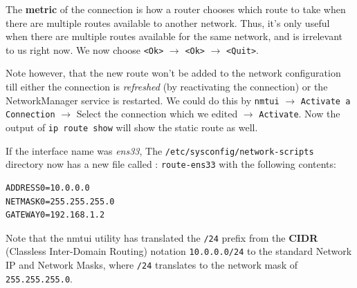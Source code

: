 The \textbf{metric} of the connection is how a router chooses which route to take when there are multiple routes available to another network. Thus, it's only useful when there are multiple routes available for the same network, and is irrelevant to us right now. We now choose \verb|<Ok>| $\rightarrow$ \verb|<Ok>| $\rightarrow$ \verb|<Quit>|. 

Note however, that the new route won't be added to the network configuration till either the connection is \textit{refreshed} (by reactivating the connection) or the NetworkManager service is restarted. We could do this by \verb|nmtui| $\rightarrow$ \verb|Activate a Connection| $\rightarrow$ Select the connection which we edited $\rightarrow$ \verb|Activate|. Now the output of \verb|ip route show| will show the static route as well. 

If the interface name was \textit{ens33}, The \verb|/etc/sysconfig/network-scripts| directory now has a new file called : \verb|route-ens33| with the following contents:

\vspace{-15pt}
\begin{verbatim}
ADDRESS0=10.0.0.0
NETMASK0=255.255.255.0
GATEWAY0=192.168.1.2
\end{verbatim}
\vspace{-10pt}	

\noindent
Note that the nmtui utility has translated the \verb|/24| prefix from the \textbf{CIDR} (Classless Inter-Domain Routing) notation \verb|10.0.0.0/24| to the standard Network IP and Network Masks, where \verb|/24| translates to the network mask of \verb|255.255.255.0|. 